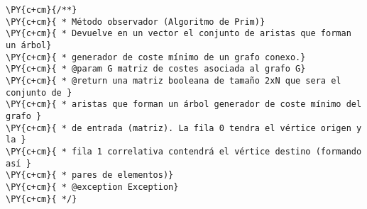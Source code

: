 \begin{Verbatim}[commandchars=\\\{\}]
\PY{c+cm}{/**}
\PY{c+cm}{ * Método observador (Algoritmo de Prim)}
\PY{c+cm}{ * Devuelve en un vector el conjunto de aristas que forman un árbol}
\PY{c+cm}{ * generador de coste mínimo de un grafo conexo.}
\PY{c+cm}{ * @param G matriz de costes asociada al grafo G}
\PY{c+cm}{ * @return una matriz booleana de tamaño 2xN que sera el conjunto de }
\PY{c+cm}{ * aristas que forman un árbol generador de coste mínimo del grafo }
\PY{c+cm}{ * de entrada (matriz). La fila 0 tendra el vértice origen y la }
\PY{c+cm}{ * fila 1 correlativa contendrá el vértice destino (formando así }
\PY{c+cm}{ * pares de elementos)}
\PY{c+cm}{ * @exception Exception}
\PY{c+cm}{ */}
\end{Verbatim}
